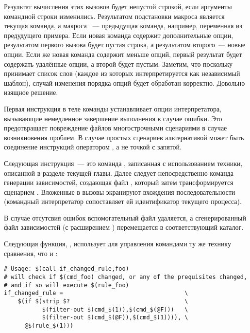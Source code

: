 Результат вычисления этих вызовов будет непустой строкой, если
аргументы командной строки изменились. Результатом подстановки макроса
 является текущая команда, а макроса
~--- предыдущая команда, например, переменная
 из предудущего
примера. Если новая команда содержит дополнительные опции, результатом
первого вызова  будет пустая строка, а
результатом второго~--- новые опции. Если же новая команда содержит
меньше опций, первый результат будет содержать удалённые опции, а
второй будет пустым. Заметим, что поскольку 
принимает список слов (каждое из которых интерпретируется как
независимый шаблон), случай изменения порядка опций будет обработан
корректно. Довольно изящное решение.

Первая инструкция в теле команды устанавливает опции интерпретатора,
вызывающие немедленное завершение выполнения в случае ошибки. Это
предотвращает повреждение файлов многострочными сценариями в случае
возникновения проблем. В случае простых сценариев альтернативой может
быть соединение инструкций оператором \command{\&\&}, а не точкой с
запятой.

Следующая инструкция~--- это команда , записанная с
использованием техники, описанной в разделе
 текущей главы. Далее следует
непосредственно команда генерации зависимостей, создающая файл
, который затем трансформируется сценарием
. Вложенные в  вызовы
 экранируют вхождения последовательности \command{\$\$}
(командный интерпретатор сопоставляет ей идентификатор текущего
процесса).

В случае отсутсвия ошибок вспомогательный файл 
удаляется, а сгенерированный файл зависимостей (с расширением
) перемещается в соответствующий каталог.

Следующая функция, , использует для
управления командами ту же технику сравнения, что и
:

\begin{verbatim}
# Usage: $(call if_changed_rule,foo)
# will check if $(cmd_foo) changed, or any of the prequisites changed,
# and if so will execute $(rule_foo)
if_changed_rule =                                   \
    $(if $(strip $?                                 \
           $(filter-out $(cmd_$(1)),$(cmd_$(@F)))   \
           $(filter-out $(cmd_$(@F)),$(cmd_$(1)))), \
      @$(rule_$(1)))
\end{verbatim}

